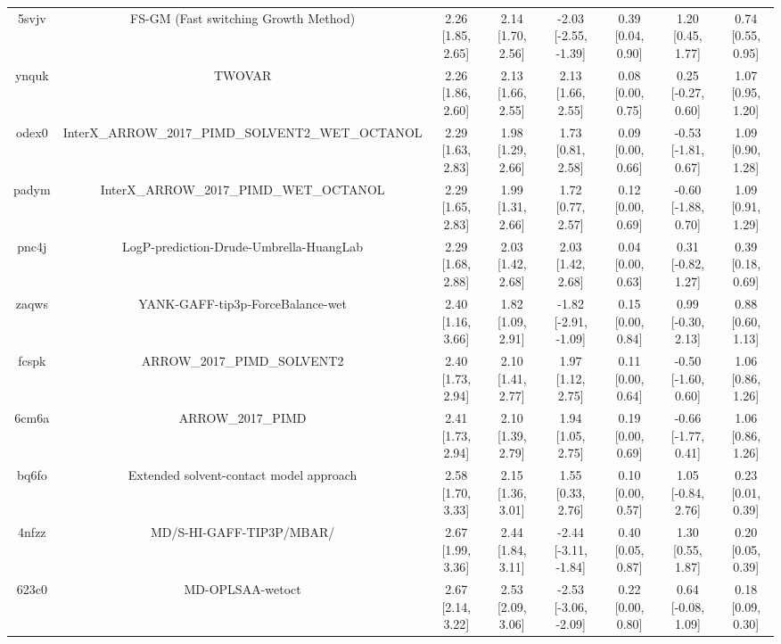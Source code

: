 \documentclass{article}
\begin{document}
\begin{center}
\begin{longtable}{|cccccccc|}
 5svjv &               FS-GM (Fast switching Growth Method) &  2.26 [1.85, 2.65] &  2.14 [1.70, 2.56] &  -2.03 [-2.55, -1.39] &  0.39 [0.04, 0.90] &    1.20 [0.45, 1.77] &     0.74 [0.55, 0.95] \\
 ynquk &                                             TWOVAR &  2.26 [1.86, 2.60] &  2.13 [1.66, 2.55] &     2.13 [1.66, 2.55] &  0.08 [0.00, 0.75] &   0.25 [-0.27, 0.60] &     1.07 [0.95, 1.20] \\
 odex0 &  InterX\_ARROW\_2017\_PIMD\_SOLVENT2\_WET\_OCTANOL &  2.29 [1.63, 2.83] &  1.98 [1.29, 2.66] &     1.73 [0.81, 2.58] &  0.09 [0.00, 0.66] &  -0.53 [-1.81, 0.67] &     1.09 [0.90, 1.28] \\
 padym &            InterX\_ARROW\_2017\_PIMD\_WET\_OCTANOL &  2.29 [1.65, 2.83] &  1.99 [1.31, 2.66] &     1.72 [0.77, 2.57] &  0.12 [0.00, 0.69] &  -0.60 [-1.88, 0.70] &     1.09 [0.91, 1.29] \\
 pnc4j &            LogP-prediction-Drude-Umbrella-HuangLab &  2.29 [1.68, 2.88] &  2.03 [1.42, 2.68] &     2.03 [1.42, 2.68] &  0.04 [0.00, 0.63] &   0.31 [-0.82, 1.27] &     0.39 [0.18, 0.69] \\
 zaqws &                   YANK-GAFF-tip3p-ForceBalance-wet &  2.40 [1.16, 3.66] &  1.82 [1.09, 2.91] &  -1.82 [-2.91, -1.09] &  0.15 [0.00, 0.84] &   0.99 [-0.30, 2.13] &     0.88 [0.60, 1.13] \\
 fcspk &                        ARROW\_2017\_PIMD\_SOLVENT2 &  2.40 [1.73, 2.94] &  2.10 [1.41, 2.77] &     1.97 [1.12, 2.75] &  0.11 [0.00, 0.64] &  -0.50 [-1.60, 0.60] &     1.06 [0.86, 1.26] \\
 6cm6a &                                  ARROW\_2017\_PIMD &  2.41 [1.73, 2.94] &  2.10 [1.39, 2.79] &     1.94 [1.05, 2.75] &  0.19 [0.00, 0.69] &  -0.66 [-1.77, 0.41] &     1.06 [0.86, 1.26] \\
 bq6fo &            Extended solvent-contact model approach &  2.58 [1.70, 3.33] &  2.15 [1.36, 3.01] &     1.55 [0.33, 2.76] &  0.10 [0.00, 0.57] &   1.05 [-0.84, 2.76] &     0.23 [0.01, 0.39] \\
 4nfzz &                           MD/S-HI-GAFF-TIP3P/MBAR/ &  2.67 [1.99, 3.36] &  2.44 [1.84, 3.11] &  -2.44 [-3.11, -1.84] &  0.40 [0.05, 0.87] &    1.30 [0.55, 1.87] &     0.20 [0.05, 0.39] \\
 623c0 &                                   MD-OPLSAA-wetoct &  2.67 [2.14, 3.22] &  2.53 [2.09, 3.06] &  -2.53 [-3.06, -2.09] &  0.22 [0.00, 0.80] &   0.64 [-0.08, 1.09] &     0.18 [0.09, 0.30] \\

\end{longtable}
\end{center}
\end{document}
